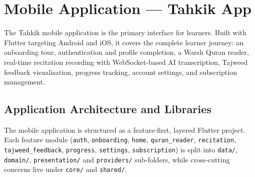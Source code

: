 \section{Mobile Application — Tahkik App}
\label{sec:impl_mobile}

\begin{emeraldbox}[title=Mobile Application]
The Tahkik mobile application is the primary interface for learners. Built with Flutter targeting Android and iOS, it covers the complete learner journey: an onboarding tour, authentication and profile completion, a Warsh Quran reader, real-time recitation recording with WebSocket-based AI transcription, Tajweed feedback visualisation, progress tracking, account settings, and subscription management.
\end{emeraldbox}

\subsection{Application Architecture and Libraries}
\label{sec:impl_app_arch}

The mobile application is structured as a feature-first, layered Flutter project. Each feature module (\texttt{auth}, \texttt{onboarding}, \texttt{home}, \texttt{quran\_reader}, \texttt{recitation}, \texttt{tajweed\_feedback}, \texttt{progress}, \texttt{settings}, \texttt{subscription}) is split into \texttt{data/}, \texttt{domain/}, \texttt{presentation/} and \texttt{providers/} sub-folders, while cross-cutting concerns live under \texttt{core/} and \texttt{shared/}.

